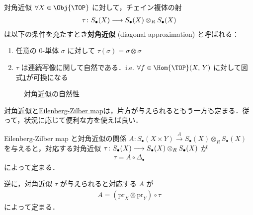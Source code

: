 \documentclass[algtopo_main]{subfiles}
\begin{document}
\begin{mydef}[label=def:d-approx]{対角近似}
    $\forall X \in \Obj{\TOP}$ に対して，チェイン複体の射
    \begin{align}
        \tau \colon S_\bullet (X) \longrightarrow S_\bullet(X) \otimes_R S_\bullet (X)
    \end{align}
    は以下の条件を充たすとき\textbf{対角近似} (diagonal approximation) と呼ばれる：
    \begin{enumerate}
        \item 任意の $0$-単体 $\sigma$ に対して $\tau(\sigma) = \sigma \otimes \sigma$
        \item $\tau$ は連続写像に関して自然である．i.e. $\forall f \in \Hom{\TOP}(X,\, Y)$ に対して図式\ref{cmtd:nat-d-approx}が可換になる
    \end{enumerate}
\end{mydef}
\begin{figure}[H]
    \centering
    \caption{対角近似の自然性}
    \label{cmtd:nat-d-approx}
\end{figure}%

\hyperref[def:d-approx]{対角近似}と\hyperref[thm:EZ]{Eilenberg-Zilber map}は，片方が与えられるともう一方も定まる．従って，状況に応じて便利な方を使えば良い．

\begin{mylem}[label=def:EZ-dapprox, breakable]{Eilenberg-Zilber map と対角近似の関係}
    $A \colon S_\bullet (X \times Y) \xrightarrow{A} S_\bullet (X) \otimes_R S_\bullet (X)$ を与えると，対応する対角近似 $\tau \colon S_\bullet (X) \longrightarrow S_\bullet(X) \otimes_R S_\bullet (X)$ が
    \begin{align}
        \tau = A \circ \Delta_\bullet
    \end{align}
    によって定まる．

    逆に，対角近似 $\tau$ が与えられると対応する $A$ が
    \begin{align}
        A = (\mathrm{pr}_X \otimes \mathrm{pr}_Y) \circ \tau
    \end{align}
    によって定まる．
\end{mylem}
\end{document}
